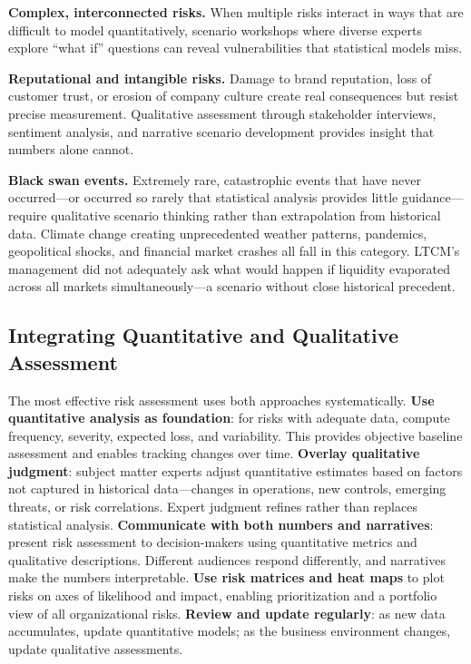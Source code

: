 \documentclass[11pt,openany]{book}
\begin{document}
\textbf{Complex, interconnected risks.} When multiple risks interact in ways
that are difficult to model quantitatively, scenario workshops where diverse
experts explore ``what if'' questions can reveal vulnerabilities that
statistical models miss.

\textbf{Reputational and intangible risks.} Damage to brand reputation, loss
of customer trust, or erosion of company culture create real consequences but
resist precise measurement. Qualitative assessment through stakeholder
interviews, sentiment analysis, and narrative scenario development provides
insight that numbers alone cannot.

\textbf{Black swan events.} Extremely rare, catastrophic events that have never
occurred---or occurred so rarely that statistical analysis provides little
guidance---require qualitative scenario thinking rather than extrapolation from
historical data. Climate change creating unprecedented weather patterns,
pandemics, geopolitical shocks, and financial market crashes all fall in this
category. LTCM's management did not adequately ask what would happen if
liquidity evaporated across all markets simultaneously---a scenario without
close historical precedent.

\subsection{Integrating Quantitative and Qualitative Assessment}
\label{subsec:qq-integration}

The most effective risk assessment uses both approaches systematically.
\textbf{Use quantitative analysis as foundation}: for risks with adequate data,
compute frequency, severity, expected loss, and variability. This provides
objective baseline assessment and enables tracking changes over time.
\textbf{Overlay qualitative judgment}: subject matter experts adjust
quantitative estimates based on factors not captured in historical data---changes
in operations, new controls, emerging threats, or risk correlations. Expert
judgment refines rather than replaces statistical analysis.
\textbf{Communicate with both numbers and narratives}: present risk assessment
to decision-makers using quantitative metrics and qualitative descriptions.
Different audiences respond differently, and narratives make the numbers
interpretable. \textbf{Use risk matrices and heat maps} to plot risks on axes
of likelihood and impact, enabling prioritization and a portfolio view of all
organizational risks. \textbf{Review and update regularly}: as new data
accumulates, update quantitative models; as the business environment changes,
update qualitative assessments.
\end{document}
